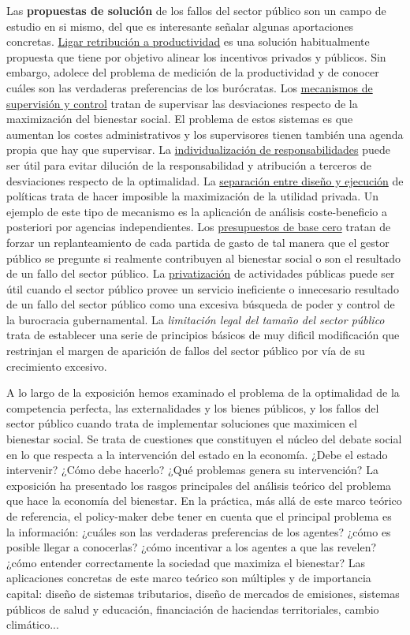 \documentclass{nuevotema}
\begin{document}
Las \textbf{propuestas de solución} de los fallos del sector público son un campo de estudio en si mismo, del que es interesante señalar algunas aportaciones concretas. \underline{Ligar retribución a productividad} es una solución habitualmente propuesta que tiene por objetivo alinear los incentivos privados y públicos. Sin embargo, adolece del problema de medición de la productividad y de conocer cuáles son las verdaderas preferencias de los burócratas. Los \underline{mecanismos de supervisión y control} tratan de supervisar las desviaciones respecto de la maximización del bienestar social. El problema de estos sistemas es que aumentan los costes administrativos y los supervisores tienen también una agenda propia que hay que supervisar. La \underline{individualización de responsabilidades} puede ser útil para evitar dilución de la responsabilidad y atribución a terceros de desviaciones respecto de la optimalidad. La \underline{separación entre diseño y ejecución} de políticas trata de hacer imposible la maximización de la utilidad privada. Un ejemplo de este tipo de mecanismo es la aplicación de análisis coste-beneficio a posteriori por agencias independientes. Los \underline{presupuestos de base cero} tratan de forzar un replanteamiento de cada partida de gasto de tal manera que el gestor público se pregunte si realmente contribuyen al bienestar social o son el resultado de un fallo del sector público. La \underline{privatización} de actividades públicas puede ser útil cuando el sector público provee un servicio ineficiente o innecesario resultado de un fallo del sector público como una excesiva búsqueda de poder y control de la burocracia gubernamental. La \textit{limitación legal del tamaño del sector público} trata de establecer una serie de principios básicos de muy dificil modificación que restrinjan el margen de aparición de fallos del sector público por vía de su crecimiento excesivo. 

A lo largo de la exposición hemos examinado el problema de la optimalidad de la competencia perfecta, las externalidades y los bienes públicos, y los fallos del sector público cuando trata de implementar soluciones que maximicen el bienestar social. Se trata de cuestiones que constituyen el núcleo del debate social en lo que respecta a la intervención del estado en la economía. ¿Debe el estado intervenir? ¿Cómo debe hacerlo? ¿Qué problemas genera su intervención? La exposición ha presentado los rasgos principales del análisis teórico del problema que hace la economía del bienestar. En la práctica, más allá de este marco teórico de referencia, el policy-maker debe tener en cuenta que el principal problema es la información: ¿cuáles son las verdaderas preferencias de los agentes? ¿cómo es posible llegar a conocerlas? ¿cómo incentivar a los agentes a que las revelen? ¿cómo entender correctamente la sociedad que maximiza el bienestar? Las aplicaciones concretas de este marco teórico son múltiples y de importancia capital: diseño de sistemas tributarios, diseño de mercados de emisiones, sistemas públicos de salud y educación, financiación de haciendas territoriales, cambio climático...
\end{document}
